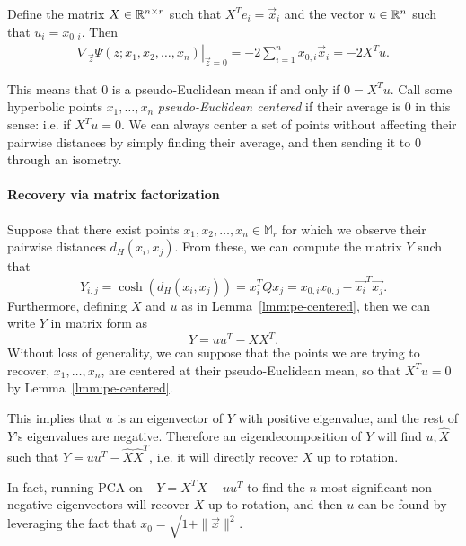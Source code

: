 \begin{lemma}
  \label{lmm:pe-centered}
  Define the matrix $X \in \mathbb{R}^{n \times r}$ such that $X^T e_i = \vec{x}_i$ and the vector $u \in \mathbb{R}^n$ such that $u_i = x_{0,i}$.
  Then
  \begin{align*}
    \left. \nabla_{\vec{z}} \Psi(z; x_1, x_2, \ldots, x_n) \right|_{\vec{z} = 0}
    =
    -2 \sum_{i=1}^n x_{0,i} \vec{x}_i
    =
    -2 X^T u.
  \end{align*}
\end{lemma}
This means that $0$ is a pseudo-Euclidean mean if and only if $0 = X^T u$.
Call some hyperbolic points $x_1, \ldots, x_n$ \emph{pseudo-Euclidean centered} if their average is $0$ in this sense: i.e. if $X^T u = 0$.
We can always center a set of points without affecting their pairwise distances by simply finding their average, and then sending it to $0$ through an isometry.

\paragraph*{Recovery via matrix factorization}
Suppose that there exist points $x_1, x_2, \ldots, x_n \in \mathbb{M}_r$
for which we observe their pairwise distances $d_H(x_i, x_j)$.
From these, we can compute the matrix $Y$ such that
\begin{equation}
  \label{eq:hmds-Y}
  Y_{i,j} = \cosh\left( d_H(x_i, x_j) \right) = x_i^T Q x_j = x_{0,i} x_{0,j} - \vec{x_i}^T \vec{x_j}.
\end{equation}
Furthermore, defining $X$ and $u$ as in Lemma~\ref{lmm:pe-centered},
then we can write $Y$ in matrix form as
\begin{equation}
  \label{eq:hmds-Y2}
  Y = u u^T - X X^T.
\end{equation}
Without loss of generality, we can suppose that the points we are trying to recover, $x_1, \ldots, x_n$, are centered at their pseudo-Euclidean mean, so that $X^T u = 0$ by Lemma~\ref{lmm:pe-centered}.

This implies that $u$ is an eigenvector of $Y$ with positive eigenvalue, and the rest of $Y$'s eigenvalues are negative.
Therefore an eigendecomposition of $Y$ will find $u,\hat{X}$ such that $Y = u u^T - \hat{X} \hat{X}^T$,
i.e. it will directly recover $X$ up to rotation.

In fact, running PCA on $-Y = X^T X - u u^T$ to find the $n$ most significant non-negative eigenvectors will recover $X$ up to rotation,
and then $u$ can be found by leveraging the fact that $x_0 = \sqrt{1 + \| \vec{x} \|^2}$.

